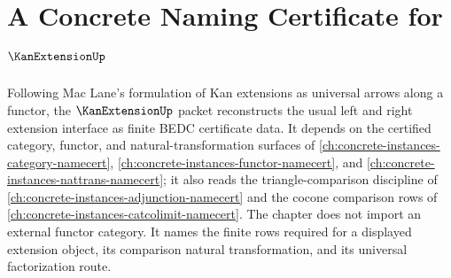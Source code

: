 \chapter{A Concrete Naming Certificate for $\KanExtensionUp$}
\label{ch:concrete-instances-kan-extension-namecert}

Following Mac Lane's formulation of Kan extensions as universal arrows along a functor, the $\KanExtensionUp$ packet reconstructs the usual left and right extension interface as finite BEDC certificate data. It depends on the certified category, functor, and natural-transformation surfaces of \autoref{ch:concrete-instances-category-namecert}, \autoref{ch:concrete-instances-functor-namecert}, and \autoref{ch:concrete-instances-nattrans-namecert}; it also reads the triangle-comparison discipline of \autoref{ch:concrete-instances-adjunction-namecert} and the cocone comparison rows of \autoref{ch:concrete-instances-catcolimit-namecert}. The chapter does not import an external functor category. It names the finite rows required for a displayed extension object, its comparison natural transformation, and its universal factorization route.

